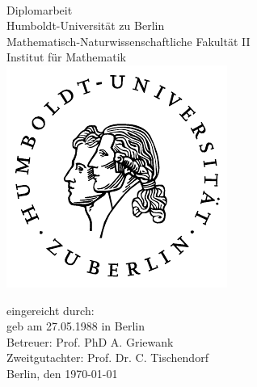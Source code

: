 \begin{spacing}{1}
\begin{titlepage}
\begin{otherlanguage}{ngerman}
\enlargethispage{4\baselineskip}
\vspace{3cm}
\begin{center}
	\Huge{\bfseries\thetitle}\\[1cm]
	\LARGE{Diplomarbeit}\\[1cm]
	\normalsize{
	Humboldt-Universität zu Berlin\\
	Mathematisch-Naturwissenschaftliche Fakultät II\\
	Institut für Mathematik\\[1cm]
	}
	\includegraphics[height=0.3\textheight]{img/plain/husiegel.pdf}\\[0.5cm]
\end{center}
\vfill

\begin{flushleft}
\large{
eingereicht durch: \theauthor\\
geb am 27.05.1988 \quad in Berlin\\
Betreuer: Prof. PhD A. Griewank\\
Zweitgutachter: Prof. Dr. C. Tischendorf\\
Berlin, den \today
}
\end{flushleft}
\end{otherlanguage}
\end{titlepage}
\end{spacing}